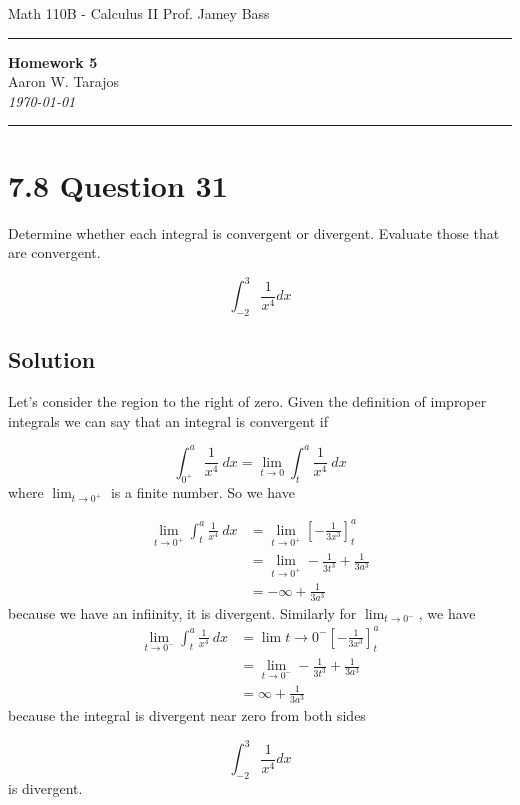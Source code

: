 \documentclass{article}
\begin{document}
\noindent
Math 110B - Calculus II  \hfill Prof. Jamey Bass

\noindent\rule{\textwidth}{0.4pt}

\begin{center}
    \textbf{\LARGE Homework 5} \\
    \vspace{12pt}
    \large Aaron W. Tarajos \\
    \textit{\today}
\end{center}

\noindent\rule{\textwidth}{0.4pt}

\section*{7.8 Question 31}
Determine whether each integral is convergent or divergent. Evaluate those that are convergent.

\[
	\int_{-2}^3 \frac{1}{x^4} dx
\]

\subsection*{Solution}
Let's consider the region to the right of zero. Given the definition of improper integrals we can say that an integral is convergent if

\[
	\int_{0^+}^a \frac{1}{x^4}\ dx= \lim_{t \to 0} \int_t^a \frac{1}{x^4}\ dx
\]
where $\lim_{t \to 0^+}$ is a finite number. So we have

\begin{align*}
	\lim_{t \to 0^+} \int_t^a \frac{1}{x^4}\ dx &= \lim_{t \to 0^+} \left[ -\frac{1}{3x^3} \right]_t^a \\
	&= \lim_{t \to 0^+} -\frac{1}{3t^3} + \frac{1}{3a^3} \\
	&= -\infty + \frac{1}{3a^3}
\end{align*}
because we have an infiinity, it is divergent. Similarly for $\lim_{t \to 0^-}$, we have
\begin{align*}
	\lim_{t \to 0^-} \int_t^a \frac{1}{x^4}\ dx &= \lim{t \to 0^-} \left[ -\frac{1}{3x^3} \right]_t^a \\
	&= \lim_{t \to 0^-} -\frac{1}{3t^3} + \frac{1}{3a^3} \\
	&= \infty + \frac{1}{3a^3}
\end{align*}
because the integral is divergent near zero from both sides

\[
	\int_{-2}^3 \frac{1}{x^4} dx
\]
is divergent.
\end{document}
